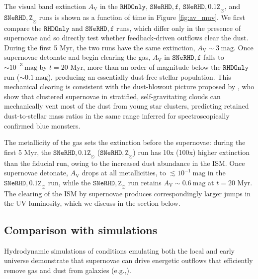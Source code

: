 \documentclass[twocolumn,linenumbers]{aastex631}
\begin{document}
The visual band extinction $A_\mathrm{V}$ in the $\mathtt{RHDOnly}$, $\mathtt{SNeRHD,f}$, $ \mathtt{SNeRHD,0.1Z}_\odot$, and $\mathtt{SNeRHD,Z}_\odot$ runs is shown as a function of time in Figure \ref{fig:av_muv}. We first compare the $\mathtt{RHDOnly}$ and $\mathtt{SNeRHD,f}$ runs, which differ only in the presence of supernovae and so directly test whether feedback-driven outflows clear the dust. During the first 5 Myr, the two runs have the same extinction, $A_\mathrm{V}\sim 3\ \mathrm{mag}$. Once supernovae detonate and begin clearing the gas, $A_\mathrm{V}$ in $\mathtt{SNeRHD,f}$ falls to $\sim 10^{-3}\ \mathrm{mag}$ by $t = 20$ Myr, more than an order of magnitude below the $\mathtt{RHDOnly}$ run ($\sim 0.1\ \mathrm{mag}$), producing an essentially dust-free stellar population. This mechanical clearing is consistent with the dust-blowout picture proposed by \citet{2026A&A...705L..10M}, who show that clustered supernovae in stratified, self-gravitating clouds can mechanically vent most of the dust from young star clusters, predicting retained dust-to-stellar mass ratios in the same range inferred for spectroscopically confirmed blue monsters.

The metallicity of the gas sets the extinction before the supernovae: during the first 5 Myr, the $\mathtt{SNeRHD,0.1Z}_\odot$ ($\mathtt{SNeRHD,Z}_\odot$) run has 10x (100x) higher extinction than the fiducial run, owing to the increased dust abundance in the ISM. Once supernovae detonate, $A_\mathrm{V}$ drops at all metallicities, to $\lesssim 10^{-1}\ \mathrm{mag}$ in the $\mathtt{SNeRHD,0.1Z}_\odot$ run, while the $\mathtt{SNeRHD,Z}_\odot$ run retains $A_\mathrm{V} \sim 0.6\ \mathrm{mag}$ at $t = 20$ Myr.
The clearing of the ISM by supernovae produces correspondingly larger jumps in the UV luminosity, which we discuss in the section below.



\subsection{Comparison with simulations}
Hydrodynamic simulations of conditions emulating both the local and early universe demonstrate that supernovae can drive energetic outflows that efficiently remove gas and dust from galaxies (e.g.,\citealt{2026ApJ..1000..158C,2018MNRAS.481.3325F}).
\end{document}
